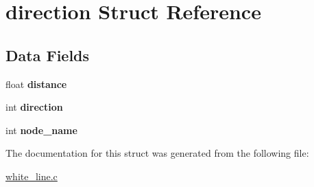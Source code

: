\hypertarget{structdirection}{
\section{direction Struct Reference}
\label{structdirection}
}
\subsection*{Data Fields}
\begin{DoxyCompactItemize}
\item 
\hypertarget{structdirection_a06f14a9abd47b91465f895d5259cdc1b}{
float {\bfseries distance}}
\label{structdirection_a06f14a9abd47b91465f895d5259cdc1b}

\item 
\hypertarget{structdirection_a886d551d5381dc3e53f17825ffc51641}{
int {\bfseries direction}}
\label{structdirection_a886d551d5381dc3e53f17825ffc51641}

\item 
\hypertarget{structdirection_a341c47c84d1a293df9e6cd19b067cdf2}{
int {\bfseries node\_\-name}}
\label{structdirection_a341c47c84d1a293df9e6cd19b067cdf2}

\end{DoxyCompactItemize}


The documentation for this struct was generated from the following file:\begin{DoxyCompactItemize}
\item 
\hyperlink{white__line_8c}{white\_\-line.c}\end{DoxyCompactItemize}
